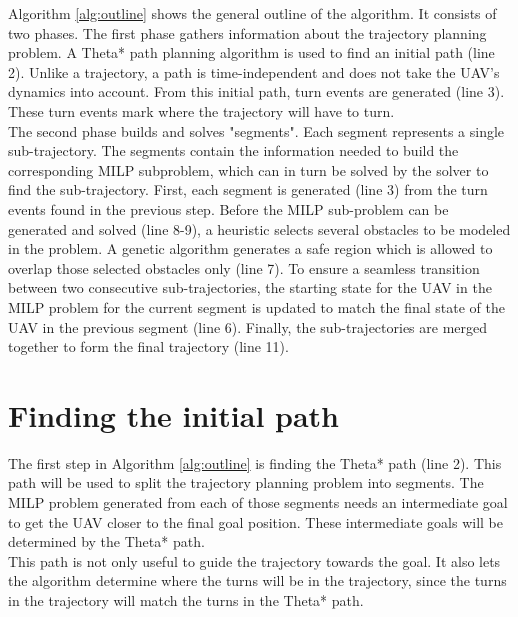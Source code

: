 Algorithm \ref{alg:outline} shows the general outline of the algorithm. It consists of two phases. The first phase gathers information about the trajectory planning problem. A Theta* path planning algorithm is used to find an initial path (line 2). Unlike a trajectory, a path is time-independent and does not take the UAV's dynamics into account. From this initial path, turn events are generated (line 3). These turn events mark where the trajectory will have to turn. \\
The second phase builds and solves "segments". Each segment represents a single sub-trajectory. The segments contain the information needed to build the corresponding MILP subproblem, which can in turn be solved by the solver to find the sub-trajectory. First, each segment is generated (line 3) from the turn events found in the previous step. Before the MILP sub-problem can be generated and solved (line 8-9), a heuristic selects several obstacles to be modeled in the problem. A genetic algorithm generates a safe region which is allowed to overlap those selected obstacles only (line 7). To ensure a seamless transition between two consecutive sub-trajectories, the starting state for the UAV in the MILP problem for the current segment is updated to match the final state of the UAV in the previous segment (line 6). Finally, the sub-trajectories are merged together to form the final trajectory (line 11).

\section{Finding the initial path}
\label{subsec:initial-path}
The first step in Algorithm \ref{alg:outline} is finding the Theta* path (line 2). This path will be used to split the trajectory planning problem into segments. The MILP problem generated from each of those segments needs an intermediate goal to get the UAV closer to the final goal position. These intermediate goals will be determined by the Theta* path. \\
This path is not only useful to guide the trajectory towards the goal. It also lets the algorithm determine where the turns will be in the trajectory, since the turns in the trajectory will match the turns in the Theta* path.

